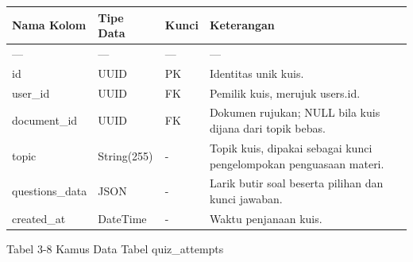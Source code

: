 \documentclass[12pt,a4paper]{article}
\begin{document}
\begin{table}[h]

\centering

\begin{tabular}{llll}

\toprule

Nama Kolom & Tipe Data & Kunci & Keterangan \\

\midrule

--- & --- & --- & --- \\

id & UUID & PK & Identitas unik kuis. \\

user\_id & UUID & FK & Pemilik kuis, merujuk users.id. \\

document\_id & UUID & FK & Dokumen rujukan; NULL bila kuis dijana dari topik bebas. \\

topic & String(255) & - & Topik kuis, dipakai sebagai kunci pengelompokan penguasaan materi. \\

questions\_data & JSON & - & Larik butir soal beserta pilihan dan kunci jawaban. \\

created\_at & DateTime & - & Waktu penjanaan kuis. \\

\bottomrule

\end{tabular}

\end{table}

Tabel 3-8	Kamus Data Tabel quiz\_attempts
\end{document}
